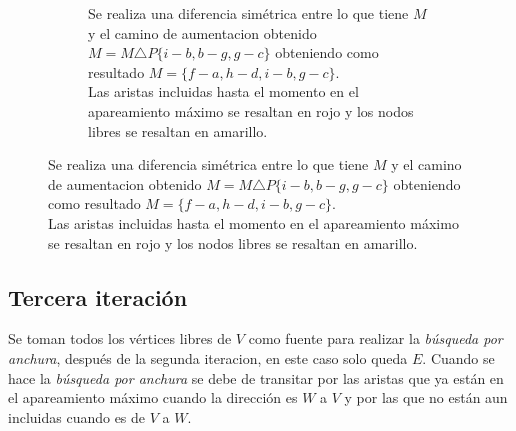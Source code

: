 \documentclass[12pt,a4paper]{article}
\begin{document}
\begin{center}
\begin{figure}[!htb]
\begin{minipage}{.45\linewidth}
\begin{subfigure}[t]{.9\linewidth}
	\captionsetup{belowskip=0pt}
                \captionsetup{justification=centering}
    		\caption{\footnotesize Se realiza una diferencia simétrica entre lo que tiene $M$ y el camino de aumentacion obtenido $M=M \triangle P\{i-b,b-g,g-c\}$ obteniendo como resultado $M=\{f-a,h-d,i-b,g-c\}$.\\Las aristas incluidas hasta el momento en el apareamiento máximo se resaltan en rojo y los nodos libres se resaltan en amarillo.}
                \label{fig:weather_activity}
            \end{subfigure}
        \end{minipage}
\end{figure}
\end{center}

\subsection{Tercera iteración} \noindent
Se toman todos los vértices libres de $V$ como fuente para realizar la \textit{búsqueda por anchura}, después de la segunda iteracion, en este caso solo queda $E$. Cuando se hace la \textit{búsqueda por anchura} se debe de transitar por las aristas que ya están en el apareamiento máximo cuando la dirección es $W$ a $V$ y por las que no están aun incluidas cuando es de $V$ a $W$. 
\end{document}
